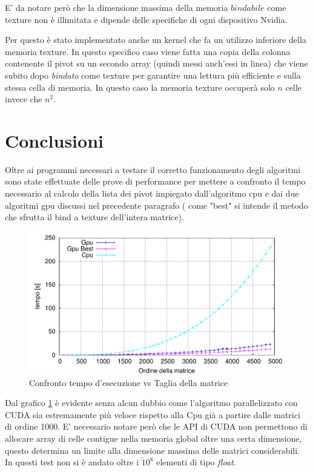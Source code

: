 \documentclass{article}
\begin{document}
E' da notare però che la dimensione massima della memoria $bindabile$ come texture non è illimitata e dipende delle specifiche di ogni dispositivo Nvidia.

Per questo è stato implementato anche un kernel che fa un utilizzo inferiore della memoria texture. In questo specifico caso viene fatta una copia della colonna contenente il pivot su un secondo array (quindi messi anch'essi in linea) che viene subito dopo \emph{bindato} come texture per garantire una lettura più efficiente e sulla stessa cella di memoria. In questo caso la memoria texture occuperà solo $n$ celle invece che $n^{2}$.


\section{Conclusioni}
Oltre ai programmi necessari a testare il corretto funzionamento degli algoritmi sono state effettuate delle prove di performance per mettere a confronto il tempo necessario al calcolo della lista dei pivot impiegato dall'algoritmo cpu e dai due algoritmi gpu discussi nel precedente paragrafo ( come "best" si intende il metodo che sfrutta il bind a texture dell'intera matrice).
\begin{figure}[ht!]
	\centering
	\includegraphics[width=180mm]{TimevsN.pdf}
	\caption{Confronto tempo d'esecuzione vs Taglia della matrice}
	\label{TimevsN}
\end{figure}
Dal grafico \ref{TimevsN} è evidente senza alcun dubbio come l'algoritmo parallelizzato con CUDA sia estremamente più veloce rispetto alla Cpu già  a partire dalle matrici di ordine 1000. E' necessario notare però che le API di CUDA non permettono di allocare array di celle contigue nella memoria global oltre una certa dimensione, questo determina un limite alla dimensione massima delle matrici considerabili. In questi test non si è andato oltre i $\tilde 10^{8}$ elementi di tipo \emph{float}.
\end{document}
